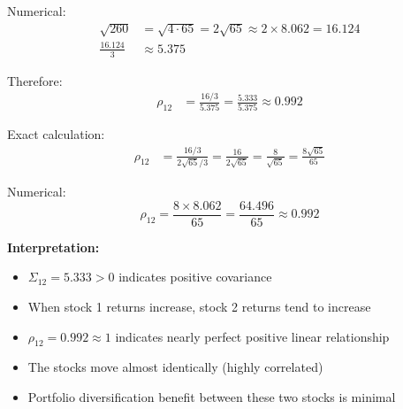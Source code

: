 \documentclass[12pt]{article}
\begin{document}
\begin{solution}
Numerical:
\begin{align*}
\sqrt{260} &= \sqrt{4 \cdot 65} = 2\sqrt{65} \approx 2 \times 8.062 = 16.124 \\
\frac{16.124}{3} &\approx 5.375
\end{align*}

Therefore:
\begin{align*}
\rho_{12} &= \frac{16/3}{5.375} = \frac{5.333}{5.375} \approx 0.992
\end{align*}

Exact calculation:
\begin{align*}
\rho_{12} &= \frac{16/3}{2\sqrt{65}/3} = \frac{16}{2\sqrt{65}} = \frac{8}{\sqrt{65}} = \frac{8\sqrt{65}}{65}
\end{align*}

Numerical:
\[
\rho_{12} = \frac{8 \times 8.062}{65} = \frac{64.496}{65} \approx 0.992
\]

\textbf{Interpretation:}

\begin{itemize}
    \item $\Sigma_{12} = 5.333 > 0$ indicates positive covariance
    \item When stock 1 returns increase, stock 2 returns tend to increase
    \item $\rho_{12} = 0.992 \approx 1$ indicates nearly perfect positive linear relationship
    \item The stocks move almost identically (highly correlated)
    \item Portfolio diversification benefit between these two stocks is minimal
\end{itemize}

\end{solution}
\end{document}
